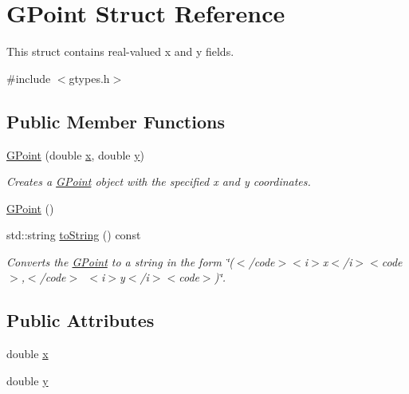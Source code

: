 \hypertarget{structsgl_1_1GPoint}{}\section{G\+Point Struct Reference}
\label{structsgl_1_1GPoint}


This struct contains real-\/valued x and y fields.  




{\ttfamily \#include $<$gtypes.\+h$>$}

\subsection*{Public Member Functions}
\begin{DoxyCompactItemize}
\item 
\mbox{\hyperlink{structsgl_1_1GPoint_af53a9d37dc824c0280f0cc05ae265f14}{G\+Point}} (double \mbox{\hyperlink{structsgl_1_1GPoint_af88b946fb90d5f08b5fb740c70e98c10}{x}}, double \mbox{\hyperlink{structsgl_1_1GPoint_ab927965981178aa1fba979a37168db2a}{y}})
\begin{DoxyCompactList}\small\item\em Creates a {\ttfamily \mbox{\hyperlink{structsgl_1_1GPoint}{G\+Point}}} object with the specified {\ttfamily x} and {\ttfamily y} coordinates. \end{DoxyCompactList}\item 
\mbox{\hyperlink{structsgl_1_1GPoint_a70204c3be75958419dddc2c8dc4a4805}{G\+Point}} ()
\item 
std\+::string \mbox{\hyperlink{structsgl_1_1GPoint_a1fe5121d6528fdea3f243321b3fa3a49}{to\+String}} () const
\begin{DoxyCompactList}\small\item\em Converts the {\ttfamily \mbox{\hyperlink{structsgl_1_1GPoint}{G\+Point}}} to a string in the form {\ttfamily \char`\"{}($<$/code$>$$<$i$>$x$<$/i$>$$<$code$>$,$<$/code$>$~$<$i$>$y$<$/i$>$$<$code$>$)\char`\"{}}. \end{DoxyCompactList}\end{DoxyCompactItemize}
\subsection*{Public Attributes}
\begin{DoxyCompactItemize}
\item 
double \mbox{\hyperlink{structsgl_1_1GPoint_af88b946fb90d5f08b5fb740c70e98c10}{x}}
\item 
double \mbox{\hyperlink{structsgl_1_1GPoint_ab927965981178aa1fba979a37168db2a}{y}}
\end{DoxyCompactItemize}


